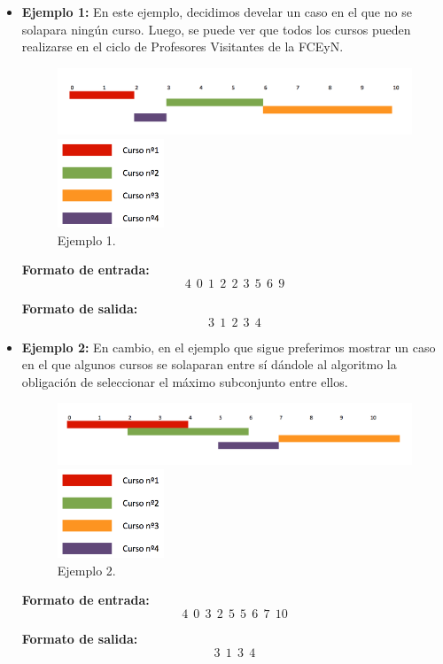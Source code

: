 \begin{itemize}
\item {\large{\textbf{Ejemplo 1:}}}\newline
En este ejemplo, decidimos develar un caso en el que no se solapara ningún curso. Luego, se puede ver que todos los cursos pueden realizarse en el ciclo de Profesores Visitantes de la FCEyN.
\begin{figure}[H] %
\begin{center}
\includegraphics[width=460pt]{../imgs/ejemplo1ej2.png}
\end{center}
\includegraphics[width=90pt]{../imgs/leyendaej2.png}
\caption{Ejemplo 1.}
\end{figure}

\textbf{Formato de entrada:} $$4\ \ 0\ \ 1\ \ 2\ \ 2\ \ 3\ \ 5\ \ 6\ \ 9$$

\textbf{Formato de salida:} $$3\ \ 1\ \ 2\ \ 3\ \ 4$$

\item {\large{\textbf{Ejemplo 2:}}}\newline
En cambio, en el ejemplo que sigue preferimos mostrar un caso en el que algunos cursos se solaparan entre sí dándole al algoritmo la obligación de seleccionar el máximo subconjunto entre ellos.

\begin{figure}[H] %
\begin{center}
\includegraphics[width=480pt]{../imgs/ejemplo2ej2.png}
\end{center}
\includegraphics[width=90pt]{../imgs/leyendaej2.png}
\caption{Ejemplo 2.}
\end{figure}

\textbf{Formato de entrada:} $$4\ \ 0\ \ 3\ \ 2\ \ 5\ \ 5\ \ 6\ \ 7\ \ 10$$

\textbf{Formato de salida:} $$3\ \ 1\ \ 3\ \ 4$$

\end{itemize}

